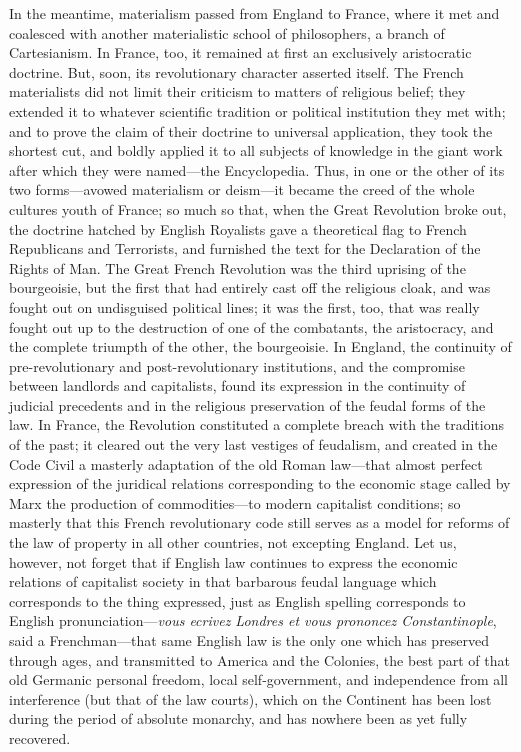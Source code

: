 In the meantime, materialism passed from England to France, where it met and
coalesced with another materialistic school of philosophers, a branch of
Cartesianism. In France, too, it remained at first an exclusively aristocratic
doctrine. But, soon, its revolutionary character asserted itself. The French
materialists did not limit their criticism to matters of religious belief; they
extended it to whatever scientific tradition or political institution they met
with; and to prove the claim of their doctrine to universal application, they
took the shortest cut, and boldly applied it to all subjects of knowledge in the
giant work after which they were named---the Encyclopedia. Thus, in one or the
other of its two forms---avowed materialism or deism---it became the creed of
the whole cultures youth of France; so much so that, when the Great Revolution
broke out, the doctrine hatched by English Royalists gave a theoretical flag to
French Republicans and Terrorists, and furnished the text for the Declaration of
the Rights of Man. The Great French Revolution was the third uprising of the
bourgeoisie, but the first that had entirely cast off the religious cloak, and
was fought out on undisguised political lines; it was the first, too, that was
really fought out up to the destruction of one of the combatants, the
aristocracy, and the complete triumpth of the other, the bourgeoisie. In
England, the continuity of pre-revolutionary and post-revolutionary
institutions, and the compromise between landlords and capitalists, found its
expression in the continuity of judicial precedents and in the religious
preservation of the feudal forms of the law. In France, the Revolution
constituted a complete breach with the traditions of the past; it cleared out
the very last vestiges of feudalism, and created in the Code Civil a masterly
adaptation of the old Roman law---that almost perfect expression of the
juridical relations corresponding to the economic stage called by Marx the
production of commodities---to modern capitalist conditions; so masterly that
this French revolutionary code still serves as a model for reforms of the law of
property in all other countries, not excepting England. Let us, however, not
forget that if English law continues to express the economic relations of
capitalist society in that barbarous feudal language which corresponds to the
thing expressed, just as English spelling corresponds to English
pronunciation---\emph{vous ecrivez Londres et vous prononcez Constantinople},
said a Frenchman---that same English law is the only one which has preserved
through ages, and transmitted to America and the Colonies, the best part of that
old Germanic personal freedom, local self-government, and independence from all
interference (but that of the law courts), which on the Continent has been lost
during the period of absolute monarchy, and has nowhere been as yet fully
recovered.

